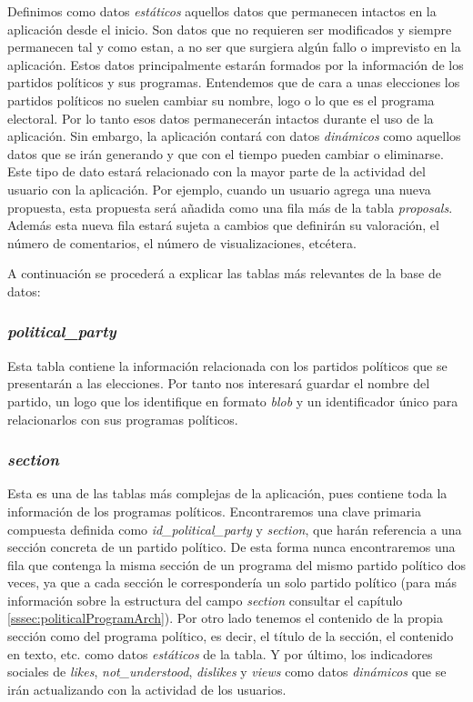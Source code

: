 Definimos como datos \textit{estáticos} aquellos datos que permanecen intactos en la aplicación desde el inicio. Son datos que no requieren ser modificados y siempre permanecen tal y como estan, a no ser que surgiera algún fallo o imprevisto en la aplicación. Estos datos principalmente estarán formados por la información de los partidos políticos y sus programas. Entendemos que de cara a unas elecciones los partidos políticos no suelen cambiar su nombre, logo o lo que es el programa electoral. Por lo tanto esos datos permanecerán intactos durante el uso de la aplicación. Sin embargo, la aplicación contará con datos \textit{dinámicos} como aquellos datos que se irán generando y que con el tiempo pueden cambiar o eliminarse. Este tipo de dato estará relacionado con la mayor parte de la actividad del usuario con la aplicación. Por ejemplo, cuando un usuario agrega una nueva propuesta, esta propuesta será añadida como una fila más de la tabla \textit{proposals}. Además esta nueva fila estará sujeta a cambios que definirán su valoración, el número de comentarios, el número de visualizaciones, etcétera.

A continuación se procederá a explicar las tablas más relevantes de la base de datos:

\subsubsection{\textit{political\_party}}

Esta tabla contiene la información relacionada con los partidos políticos que se presentarán a las elecciones. Por tanto nos interesará guardar el nombre del partido, un logo que los identifique en formato \textit{blob} y un identificador único para relacionarlos con sus programas políticos.

\subsubsection{\textit{section}}

Esta es una de las tablas más complejas de la aplicación, pues contiene toda la información de los programas políticos. Encontraremos una clave primaria compuesta definida como \textit{id\_political\_party} y \textit{section}, que harán referencia a una sección concreta de un partido político. De esta forma nunca encontraremos una fila que contenga la misma sección de un programa del mismo partido político dos veces, ya que a cada sección le correspondería un solo partido político (para más información sobre la estructura del campo \textit{section} consultar el capítulo \ref{sssec:politicalProgramArch}). Por otro lado tenemos el contenido de la propia sección como del programa político, es decir, el título de la sección, el contenido en texto, etc. como datos \textit{estáticos} de la tabla. Y por último, los indicadores sociales de \textit{likes}, \textit{not\_understood}, \textit{dislikes} y \textit{views} como datos \textit{dinámicos} que se irán actualizando con la actividad de los usuarios.

